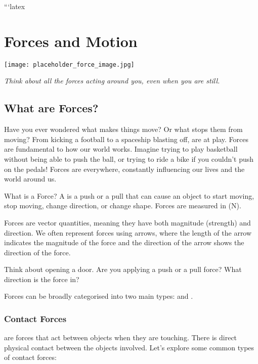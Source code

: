 ```latex
\chapter{Forces and Motion}

\begin{marginfigure}
\texttt{[image: placeholder\_force\_image.jpg]}
\caption*{\textit{Think about all the forces acting around you, even when you are still.}}
\end{marginfigure}

\section{What are Forces?}

Have you ever wondered what makes things move? Or what stops them from moving?  From kicking a football to a spaceship blasting off,  are at play.  Forces are fundamental to how our world works.  Imagine trying to play basketball without being able to push the ball, or trying to ride a bike if you couldn't push on the pedals!  Forces are everywhere, constantly influencing our lives and the world around us.

\begin{keyconcept}{What is a Force?}
A  is a push or a pull that can cause an object to start moving, stop moving, change direction, or change shape. Forces are measured in  (N).
\end{keyconcept}

Forces are vector quantities, meaning they have both magnitude (strength) and direction. We often represent forces using arrows, where the length of the arrow indicates the magnitude of the force and the direction of the arrow shows the direction of the force.

\begin{stopandthink}
Think about opening a door.  Are you applying a push or a pull force? What direction is the force in?
\end{stopandthink}

Forces can be broadly categorised into two main types:  and .

\subsection{Contact Forces}

\begin{marginnote}
\end{marginnote}
 are forces that act between objects when they are touching.  There is direct physical contact between the objects involved.  Let's explore some common types of contact forces:

